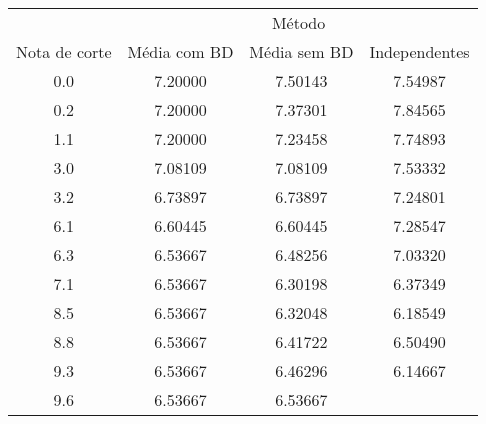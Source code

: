 \begin{tabular}{c ccc}
        \hline
                      & \multicolumn{3}{c}{Método} \\ \cline{2-4}
        Nota de corte & Média com BD & Média sem BD & Independentes \\
        \hline
        0.0  & 7.20000 & 7.50143 & 7.54987  \\
        0.2  & 7.20000 & 7.37301 & 7.84565  \\
        1.1  & 7.20000 & 7.23458 & 7.74893  \\
        \rowcolor{lightgray}
        3.0  & 7.08109 & 7.08109 & 7.53332  \\
        \rowcolor{lightgray}
        3.2  & 6.73897 & 6.73897 & 7.24801  \\
        \rowcolor{lightgray}
        6.1  & 6.60445 & 6.60445 & 7.28547  \\
        6.3  & 6.53667 & 6.48256 & 7.03320  \\
        7.1  & 6.53667 & 6.30198 & 6.37349  \\
        8.5  & 6.53667 & 6.32048 & 6.18549  \\
        8.8  & 6.53667 & 6.41722 & 6.50490  \\
        9.3  & 6.53667 & 6.46296 & 6.14667  \\
        9.6  & 6.53667 & 6.53667 &          \\
        \hline
\end{tabular}
